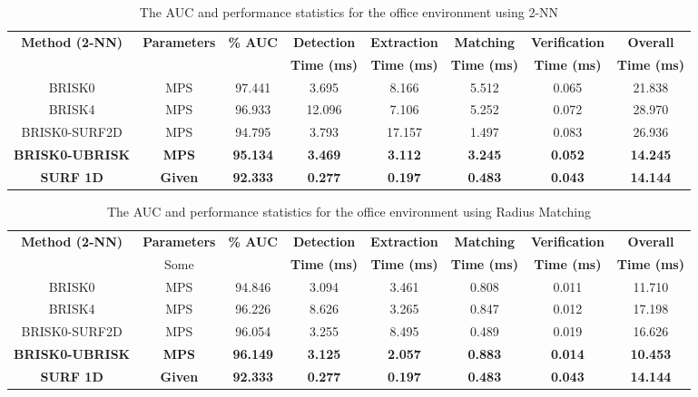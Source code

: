 \documentclass[11pt]{report}
\begin{document}
\begin{table}
\caption{The AUC and performance statistics for the office environment using
2-NN}
\footnotesize
\begin{tabular}{|c|c|c|c|c|c|c|c|}
\hline 
\textbf{Method (2-NN)} & \textbf{Parameters} & \textbf{\% AUC} & \textbf{Detection} & \textbf{Extraction} & \textbf{Matching} & \textbf{Verification} & \textbf{Overall}\tabularnewline
 &  &  & \textbf{Time (ms)} & \textbf{Time (ms)} & \textbf{Time (ms)} & \textbf{Time (ms)} & \textbf{Time (ms)}\tabularnewline
\hline 
\hline 
BRISK0 & MPS & 97.441 & 3.695 & 8.166 & 5.512 & 0.065 & 21.838\tabularnewline
\hline 
BRISK4 & MPS & 96.933 & 12.096 & 7.106 & 5.252 & 0.072 & 28.970\tabularnewline
\hline 
BRISK0-SURF2D & MPS & 94.795 & 3.793 & 17.157 & 1.497 & 0.083 & 26.936\tabularnewline
\hline 
\textbf{BRISK0-UBRISK} & \textbf{MPS} & \textbf{95.134} & \textbf{3.469} & \textbf{3.112} & \textbf{3.245} & \textbf{0.052} & \textbf{14.245}\tabularnewline
\hline 
\textbf{SURF 1D} & \textbf{Given} & \textbf{92.333} & \textbf{0.277} & \textbf{0.197} & \textbf{0.483} & \textbf{0.043} & \textbf{14.144}\tabularnewline
\hline 
\end{tabular}
\label{tab:oe_times_knn}
\end{table}

\begin{table}
\caption{The AUC and performance statistics for the office environment using
Radius Matching}
\footnotesize
\begin{tabular}{|c|c|c|c|c|c|c|c|}
\hline 
\textbf{Method (2-NN)} & \textbf{Parameters} & \textbf{\% AUC} & \textbf{Detection} & \textbf{Extraction} & \textbf{Matching} & \textbf{Verification} & \textbf{Overall}\tabularnewline
 & Some  &  & \textbf{Time (ms)} & \textbf{Time (ms)} & \textbf{Time (ms)} & \textbf{Time (ms)} & \textbf{Time (ms)}\tabularnewline
\hline 
\hline 
BRISK0 & MPS & 94.846 & 3.094 & 3.461 & 0.808 & 0.011 & 11.710\tabularnewline
\hline 
BRISK4 & MPS & 96.226 & 8.626 & 3.265 & 0.847 & 0.012 & 17.198\tabularnewline
\hline 
BRISK0-SURF2D & MPS & 96.054 & 3.255 & 8.495 & 0.489 & 0.019 & 16.626\tabularnewline
\hline 
\textbf{BRISK0-UBRISK} & \textbf{MPS} & \textbf{96.149} & \textbf{3.125} & \textbf{2.057} & \textbf{0.883} & \textbf{0.014} & \textbf{10.453}\tabularnewline
\hline 
\textbf{SURF 1D} & \textbf{Given} & \textbf{92.333} & \textbf{0.277} & \textbf{0.197} & \textbf{0.483} & \textbf{0.043} & \textbf{14.144}\tabularnewline
\hline 
\end{tabular}
\label{tab:oe_times_hamming}
\end{table}
\end{document}
